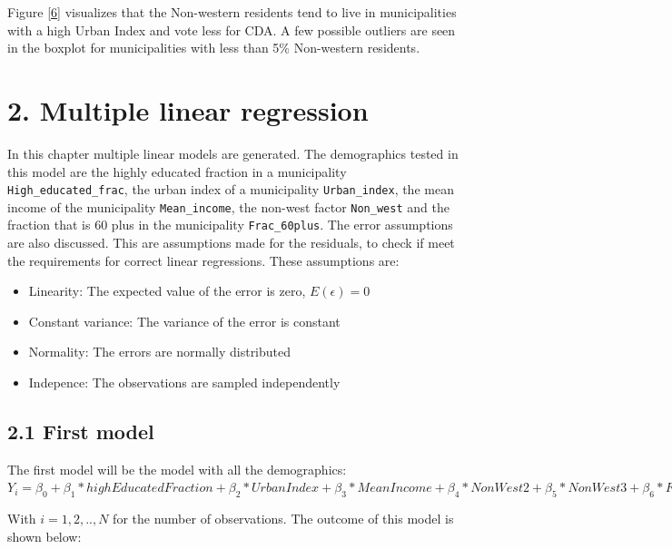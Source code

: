 \documentclass[11pt,]{article}
\begin{document}
Figure \ref{6} visualizes that the Non-western residents tend to live in
municipalities with a high Urban Index and vote less for CDA. A few
possible outliers are seen in the boxplot for municipalities with less
than 5\% Non-western residents.

\section{2. Multiple linear
regression}\label{multiple-linear-regression}

In this chapter multiple linear models are generated. The demographics
tested in this model are the highly educated fraction in a municipality
\texttt{High\_educated\_frac}, the urban index of a municipality
\texttt{Urban\_index}, the mean income of the municipality
\texttt{Mean\_income}, the non-west factor \texttt{Non\_west} and the
fraction that is 60 plus in the municipality \texttt{Frac\_60plus}. The
error assumptions are also discussed. This are assumptions made for the
residuals, to check if meet the requirements for correct linear
regressions. These assumptions are:

\begin{itemize}
\item Linearity: The expected value of the error is zero, $E(\epsilon) = 0$
\item Constant variance: The variance of the error is constant 
\item Normality: The errors are normally distributed
\item Indepence: The observations are sampled independently
\end{itemize}

\subsection{2.1 First model}\label{first-model}

The first model will be the model with all the demographics:\\
\(Y_i = \beta_0 + \beta_1*high Educated Fraction + \beta_2*Urban Index + \beta_3*Mean Income + \beta_4*Non West2 +\beta_5*Non West3 + \beta_6*Frac 60plus + \epsilon_i\)

With \(i = 1, 2,.., N\) for the number of observations. The outcome of
this model is shown below:
\end{document}
